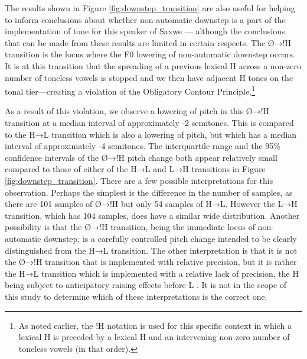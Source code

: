 \documentclass[
  11pt,
  b5paper,
]{article}
\begin{document}
The results shown in Figure \ref{fig:downstep_transition} are also
useful for helping to inform conclusions about whether non-automatic
downstep is a part of the implementation of tone for this speaker of
Saxwe --- although the conclusions that can be made from these results
are limited in certain respects. The Ø→!H transition is the locus where
the F0 lowering of non-automatic downstep occurs. It is at this
transition that the spreading of a previous lexical H across a non-zero
number of toneless vowels is stopped and we then have adjacent H tones
on the tonal tier---creating a violation of the Obligatory Contour
Principle.\footnote{As noted earlier, the !H notation is used for this
  specific context in which a lexical H is preceded by a lexical H and
  an intervening non-zero number of toneless vowels (in that order).}

As a result of this violation, we observe a lowering of pitch in this
Ø→!H transition at a median interval of approximately -2 semitones. This
is compared to the H→L transition which is also a lowering of pitch, but
which has a median interval of approximately -4 semitones. The
interquartile range and the 95\% confidence intervals of the Ø→!H pitch
change both appear relatively small compared to those of either of the
H→L and L→H transitions in Figure \ref{fig:downstep_transition}. There
are a few possible interpretations for this observation. Perhaps the
simplest is the difference in the number of samples, as there are 101
samples of Ø→!H but only 54 samples of H→L. However the L→H transition,
which has 104 samples, does have a similar wide distribution. Another
possibility is that the Ø→!H transition, being the immediate locus of
non-automatic downstep, is a carefully controlled pitch change intended
to be clearly distinguished from the H→L transition. The other
interpretation is that it is not the Ø→!H transition that is implemented
with relative precision, but it is rather the H→L transition which is
implemented with a relative lack of precision, the H being subject to
anticipatory raising effects before L \autocite{laniran_downstep_2003}.
It is not in the scope of this study to determine which of these
interpretations is the correct one.
\end{document}
